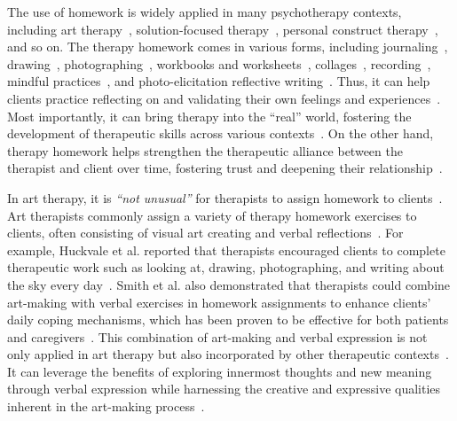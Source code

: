 The use of homework is widely applied in many psychotherapy contexts, including art therapy~\cite{kazantzis2000homework, huckvale2009case}, solution-focused therapy~\cite{beyebach1996research}, personal construct therapy~\cite{kazantzis2007handbook}, and so on.
The therapy homework comes in various forms, including journaling~\cite{hoshino2011narrative,dattilio2012collaboration}, drawing~\cite{hoshino2011narrative}, photographing~\cite{huckvale2009case}, workbooks and worksheets~\cite{riley2003family,Oewel_2024}, collages~\cite{riley2003family}, recording~\cite{Oewel_2024}, mindful practices~\cite{smith2019visual}, and photo-elicitation reflective writing~\cite{davis2015mindful}.
Thus, it can help clients practice reflecting on and validating their own feelings and experiences~\cite{riley2003family}. 
Most importantly, it can bring therapy into the ``real'' world, fostering the development of therapeutic skills across various contexts~\cite{kazantzis2007handbook}.
On the other hand, therapy homework helps strengthen the therapeutic alliance between the therapist and client over time, fostering trust and deepening their relationship~\cite{huckvale2009case,cronin2015integrating,sezaki2000home}.


In art therapy, it is \textit{``not unusual''} for therapists to assign homework to clients~\cite{hoshino2011narrative}.
Art therapists commonly assign a variety of therapy homework exercises to clients, often consisting of visual art creating and verbal reflections~\cite{huckvale2009case,smith2019visual,davis2015mindful,hoshino2011narrative}. 
For example, Huckvale et al. reported that therapists encouraged clients to complete therapeutic work such as looking at, drawing, photographing, and writing about the sky every day~\cite{huckvale2009case}.
Smith et al. also demonstrated that therapists could combine art-making with verbal exercises in homework assignments to enhance clients' daily coping mechanisms, which has been proven to be effective for both patients and caregivers~\cite{smith2019visual}.
This combination of art-making and verbal expression is not only applied in art therapy but also incorporated by other therapeutic contexts~\cite{peretz2023machine,kazantzis2007handbook}. It can leverage the benefits of exploring innermost thoughts and new meaning through verbal expression while harnessing the creative and expressive qualities inherent in the art-making process~\cite{smith2019visual}. 

